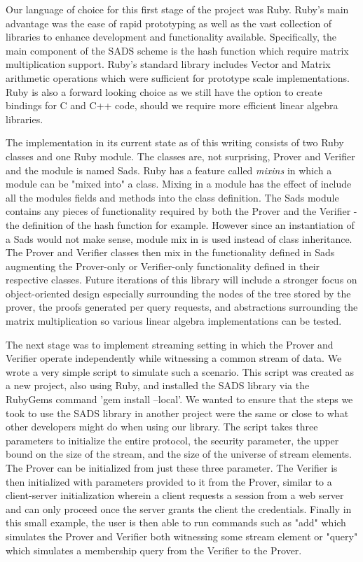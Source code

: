 \documentclass[11pt, letterpaper, oneside]{article}
\begin{document}
	Our language of choice for this first stage of the project was Ruby.
	Ruby's main advantage was the ease of rapid prototyping as well as the vast collection of libraries to enhance development and functionality available.
	Specifically, the main component of the SADS scheme is the hash function which require matrix multiplication support.
	Ruby's standard library includes Vector and Matrix arithmetic operations which were sufficient for prototype scale implementations.
	Ruby is also a forward looking choice as we still have the option to create bindings for C and C++ code, should we require more efficient linear algebra libraries.
	
	The implementation in its current state as of this writing consists of two Ruby classes and one Ruby module.
	The classes are, not surprising, Prover and Verifier and the module is named Sads.
	Ruby has a feature called \textit{mixins} in which a module can be "mixed into" a class.
	Mixing in a module has the effect of include all the modules fields and methods into the class definition.
	The Sads module contains any pieces of functionality required by both the Prover and the Verifier - the definition of the hash function for example.
	However since an instantiation of a Sads would not make sense, module mix in is used instead of class inheritance.
	The Prover and Verifier classes then mix in the functionality defined in Sads augmenting the Prover-only or Verifier-only functionality defined in their respective classes.
		Future iterations of this library will include a stronger focus on object-oriented design especially surrounding the nodes of the tree stored by the prover, the proofs generated per query requests, and abstractions surrounding the matrix multiplication so various linear algebra implementations can be tested.
	
	The next stage was to implement streaming setting in which the Prover and Verifier operate independently while witnessing a common stream of data.
	We wrote a very simple script to simulate such a scenario.
	This script was created as a new project, also using Ruby, and installed the SADS library via the RubyGems command 'gem install --local'.
	We wanted to ensure that the steps we took to use the SADS library in another project were the same or close to what other developers might do when using our library.
	The script takes three parameters to initialize the entire protocol, the security parameter, the upper bound on the size of the stream, and the size of the universe of stream elements.
	The Prover can be initialized from just these three parameter.
	The Verifier is then initialized with parameters provided to it from the Prover, similar to a client-server initialization wherein a client requests a session from a web server and can only proceed once the server grants the client the credentials.
	Finally in this small example, the user is then able to run commands such as "add" which simulates the Prover and Verifier both witnessing some stream element or "query" which simulates a membership query from the Verifier to the Prover.
	
\end{document}
